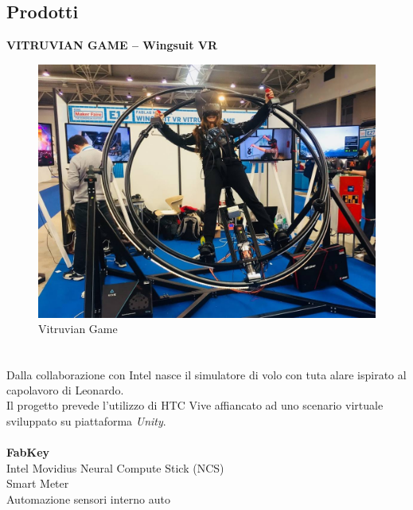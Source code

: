 \subsection{Prodotti}
\textbf{VITRUVIAN GAME – Wingsuit VR}\\
\begin{figure}[h]
\begin{center}
	\includegraphics[scale=0.2]{immagini/vitruvian.jpg}
	\caption{Vitruvian Game}
\end{center}
\end{figure}
\\
Dalla collaborazione con Intel\textsuperscript{\textregistered} nasce il simulatore di volo con tuta alare ispirato al capolavoro di Leonardo.\\
Il progetto prevede l'utilizzo di HTC Vive affiancato ad uno scenario virtuale sviluppato su piattaforma \textit{Unity}.
\\
\\
\textbf{FabKey}
\\Intel Movidius Neural Compute Stick (NCS) 
\\Smart Meter
\\Automazione sensori interno auto


